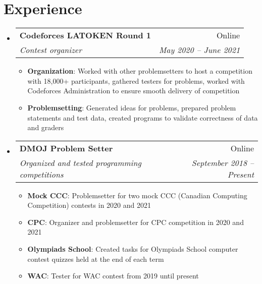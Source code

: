 \documentclass[letterpaper,11pt]{article}
\makeatletter
\newcommand{\resumeItem}[2]{
  \item\small{
    \textbf{#1}{: #2 \vspace{-2pt}}
  }
}
\newcommand{\resumeSubheading}[4]{
  \vspace{-1pt}\item
    \begin{tabular*}{0.97\textwidth}[t]{l@{\extracolsep{\fill}}r}
      \textbf{#1} & #2 \\
      \textit{\small#3} & \textit{\small #4} \\
    \end{tabular*}\vspace{-5pt}
}
\newcommand{\resumeSubSubheading}[2]{
    \begin{tabular*}{0.97\textwidth}{l@{\extracolsep{\fill}}r}
      \textit{\small#1} & \textit{\small #2} \\
    \end{tabular*}\vspace{-5pt}
}
\newcommand{\resumeSubHeadingListStart}{\begin{itemize}[leftmargin=*]}
\newcommand{\resumeSubHeadingListEnd}{\end{itemize}}
\newcommand{\resumeItemListStart}{\begin{itemize}}
\newcommand{\resumeItemListEnd}{\end{itemize}\vspace{-5pt}}
\makeatother
\begin{document}
\section{Experience}
  \resumeSubHeadingListStart
    
    \resumeSubheading
      {Codeforces LATOKEN Round 1}{Online}
      {Contest organizer}{May 2020 -- June 2021}
      \resumeItemListStart
        \resumeItem{Organization}
          {Worked with other problemsetters to host a competition with 18,000+ participants, gathered testers for problems, worked with Codeforces Administration to ensure smooth delivery of competition}
        \resumeItem{Problemsetting}
          {Generated ideas for problems, prepared problem statements and test data, created programs to validate correctness of data and graders}
      \resumeItemListEnd
    
    \resumeSubheading
      {DMOJ Problem Setter}{Online}
      {Organized and tested programming competitions}{September 2018 -- Present}
      \resumeItemListStart
        \resumeItem{Mock CCC}
          {Problemsetter for two mock CCC (Canadian Computing Competition) contests in 2020 and 2021}
        \resumeItem{CPC}
          {Organizer and problemsetter for CPC competition in 2020 and 2021}
        \resumeItem{Olympiads School}
          {Created tasks for Olympiads School computer contest quizzes held at the end of each term}
        \resumeItem{WAC}
          {Tester for WAC contest from 2019 until present}
      \resumeItemListEnd
    


  \resumeSubHeadingListEnd


\end{document}
